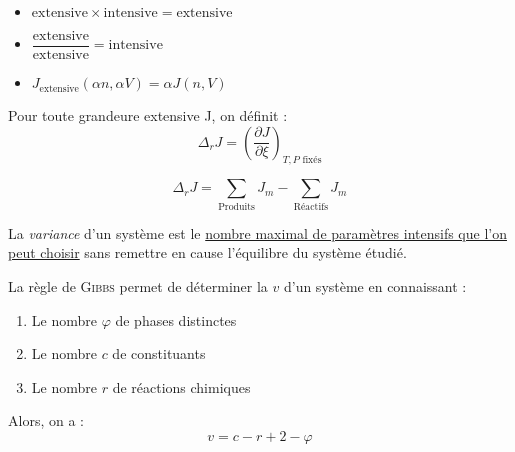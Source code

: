 \documentclass[11pt,a4paper,fleqn,pdftex]{report}
\begin{document}
\begin{prop}
  \begin{itemize}[label=$\bullet$]
   \item $\mathrm{extensive}\times \mathrm{intensive}= \mathrm{extensive}$ \\
   \item $\dfrac{\mathrm{extensive}}{\mathrm{extensive}}= \mathrm{intensive}$ \\
   \item $J_\mathrm{extensive}\left( \alpha n, \alpha V \right) = \alpha J(n,V)$
  \end{itemize}
\end{prop}

\begin{dfn}
  Pour toute grandeure extensive J, on définit : 
  \begin{equation}
  \Delta_r J = \left( \dfrac{\partial J}{\partial \xi} \right)_{\text{$T,P$ fixés}}
  \end{equation}
\end{dfn}

\begin{theorem}
  \begin{equation}
    \Delta_r J = \sum_\text{Produits} J_m - \sum_\text{Réactifs} J_m 
  \end{equation}
\end{theorem}
\begin{dfn}[Variance]
  La \emph{variance} d'un système est le \uline{nombre maximal de paramètres intensifs que l'on peut choisir} sans remettre en cause l'équilibre du système étudié.
\end{dfn}
\begin{itheorem}
  La règle de \textsc{Gibbs} permet de déterminer la  $v$ d'un système en connaissant : 
  \renewcommand{\theenumi}{\roman{enumi}}%
  \begin{enumerate}
    \item Le nombre $\varphi$ de phases distinctes
    \item Le nombre $c$ de constituants
    \item Le nombre $r$ de réactions chimiques
  \end{enumerate}
  Alors, on a : 
  \begin{equation}
  v = c - r + 2 - \varphi
  \end{equation}
\end{itheorem}
\end{document}
